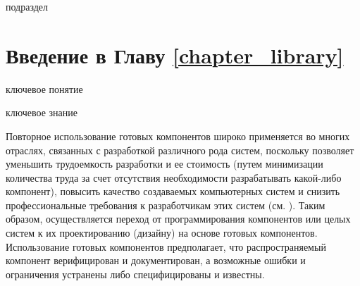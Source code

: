 \bigskip

\begin{SCn}
\begin{scnrelfromlist}{подраздел}
\end{scnrelfromlist}
\end{SCn}

\section*{Введение в Главу \ref{chapter_library}}
\label{ostis_library_introduction}

\begin{SCn}
\begin{scnrelfromlist}{ключевое понятие}
\end{scnrelfromlist}
\end{SCn}

\bigskip

\begin{SCn}
\begin{scnrelfromlist}{ключевое знание}
\end{scnrelfromlist}
\end{SCn}

\bigskip

Повторное использование готовых компонентов широко применяется во многих отраслях, связанных с разработкой различного рода систем, поскольку позволяет уменьшить трудоемкость разработки и ее стоимость (путем минимизации количества труда за счет отсутствия необходимости разрабатывать какой-либо компонент), повысить качество создаваемых компьютерных систем и снизить профессиональные требования к разработчикам этих систем (см. ). Таким образом, осуществляется переход от программирования компонентов или целых систем к их проектированию (дизайну) на основе готовых компонентов. Использование готовых компонентов предполагает, что распространяемый компонент верифицирован и документирован, а возможные ошибки и ограничения устранены либо специфицированы и известны.

